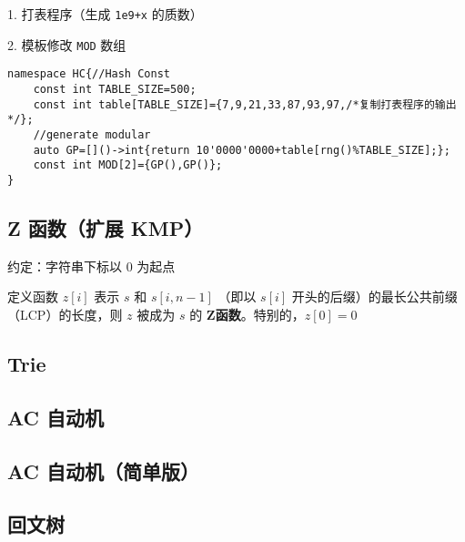 \documentclass[12pt]{article}
\begin{document}
1. 打表程序（生成 \texttt{1e9+x} 的质数）



2. 模板修改 \texttt{MOD} 数组

\begin{lstlisting}[style=C++]
namespace HC{//Hash Const
	const int TABLE_SIZE=500;
	const int table[TABLE_SIZE]={7,9,21,33,87,93,97,/*复制打表程序的输出*/};
	//generate modular
	auto GP=[]()->int{return 10'0000'0000+table[rng()%TABLE_SIZE];};
	const int MOD[2]={GP(),GP()};
}
\end{lstlisting}

\newpage

\subsection{Z 函数（扩展 KMP）}

约定：字符串下标以 $0$ 为起点

定义函数 $z[i]$ 表示 $s$ 和 $s[i,n-1]$ （即以 $s[i]$ 开头的后缀）的最长公共前缀（LCP）的长度，则 $z$ 被成为 $s$ 的 \textbf{Z函数}。特别的，$z[0]=0$



\newpage

\subsection{Trie}



\newpage

\subsection{AC 自动机}



\newpage

\subsection{AC 自动机（简单版）}



\newpage

\subsection{回文树}
\end{document}
